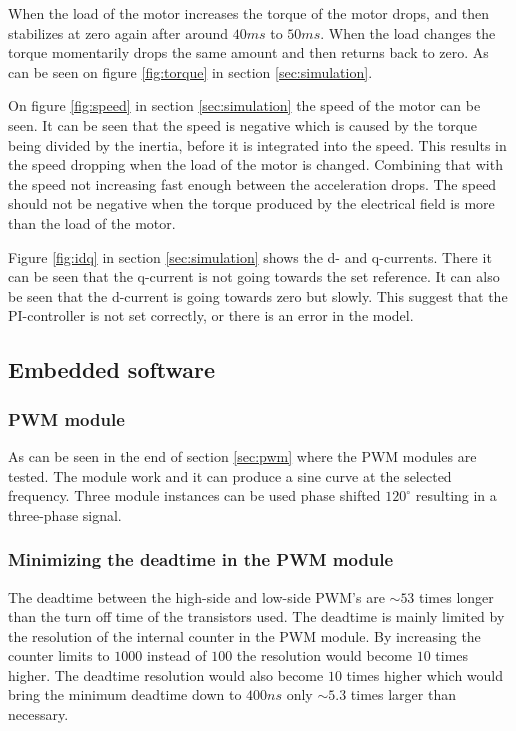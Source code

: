 When the load of the motor increases the torque of the motor drops, and then stabilizes at zero again after around $40 ms$ to $50 ms$. When the load changes the torque momentarily drops the same amount and then returns back to zero. As can be seen on figure \ref{fig:torque} in section \ref{sec:simulation}.

On figure \ref{fig:speed} in section \ref{sec:simulation} the speed of the motor can be seen. It can be seen that the speed is negative which is caused by the torque being divided by the inertia, before it is integrated into the speed. This results in the speed dropping when the load of the motor is changed.
Combining that with the speed not increasing fast enough between the acceleration drops. The speed should not be negative when the torque produced by the electrical field is more than the load of the motor.

Figure \ref{fig:idq} in section \ref{sec:simulation} shows the d- and q-currents. There it can be seen that the q-current is not going towards the set reference. It can also be seen that the d-current is going towards zero but slowly. This suggest that the PI-controller is not set correctly, or there is an error in the model. 


\subsection{Embedded software}
\subsubsection{PWM module}
As can be seen in the end of section \ref{sec:pwm} where the PWM modules are tested. The module work and it can produce a sine curve at the selected frequency. Three module instances can be used phase shifted $120^\circ$ resulting in a three-phase signal.

\subsubsection{Minimizing the deadtime in the PWM module}
The deadtime between the high-side and low-side PWM's are $\sim 53$ times longer than the turn off time of the transistors used. The deadtime is mainly limited by the resolution of the internal counter in the PWM module. By increasing the counter limits to $1000$ instead of $100$ the resolution would become $10$ times higher. The deadtime resolution would also become $10$ times higher which would bring the minimum deadtime down to $400ns$ only $\sim 5.3$ times larger than necessary.

